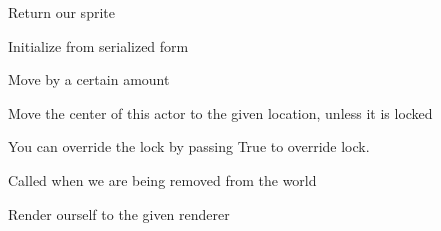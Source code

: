 \documentclass[letterpaper,10pt,english]{sphinxmanual}
\begin{document}
\begin{fulllineitems}

\begin{fulllineitems}
\label{actor:serge.actor.Actor.getSpriteName}
Return our sprite

\end{fulllineitems}


\begin{fulllineitems}
\label{actor:serge.actor.Actor.init}
Initialize from serialized form

\end{fulllineitems}


\begin{fulllineitems}
\label{actor:serge.actor.Actor.move}
Move by a certain amount

\end{fulllineitems}


\begin{fulllineitems}
\label{actor:serge.actor.Actor.moveTo}
Move the center of this actor to the given location, unless it is locked

You can override the lock by passing True to override lock.

\end{fulllineitems}


\begin{fulllineitems}
\label{actor:serge.actor.Actor.removedFromWorld}
Called when we are being removed from the world

\end{fulllineitems}


\begin{fulllineitems}
\label{actor:serge.actor.Actor.renderTo}
Render ourself to the given renderer


\end{fulllineitems}
\end{fulllineitems}
\end{document}
